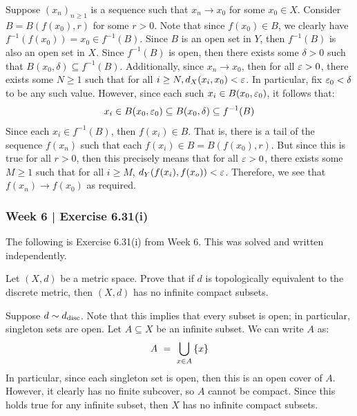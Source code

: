 \begin{pf}
    Suppose $ (x_{n})_{n \geq 1} $ is a sequence such that $ x_{n} \rightarrow
    x_{0} $ for some $ x_{0} \in X $. \vsp
    Consider $ B = B(f(x_{0}), r) $ for some $ r > 0 $.
    Note that since $ f(x_{0}) \in B $, we clearly have $ f^{-1}(f(x_{0})) =
    x_{0} \in f^{-1}(B) $. Since $ B $ is an open set in $ Y $, then
    $ f^{-1}(B) $ is also an open set in $ X $. \vsp
    Since $ f^{-1}(B) $ is open, then there exists some $ \delta > 0 $ such that
    $ B(x_{0}, \delta) \subseteq f^{-1}(B) $.
    Additionally, since $ x_{n} \rightarrow x_{0} $, then for all $ \operatorname{\varepsilon} > 0 $,
    there exists some $ N \geq 1 $ such that for all $ i \geq N, d_{X}(x_{i},
    x_{0}) < \operatorname{\varepsilon} $. In particular, fix $ \operatorname{\varepsilon}_{0} < \delta $ to be any such value.
    However, since each such $ x_{i} \in B(x_{0}, \operatorname{\varepsilon}_{0}) $, it follows that:
    \begin{equation*}
        x_{i} \in B(x_{0}, \operatorname{\varepsilon}_{0}) \subseteq B(x_{0}, \delta) \subseteq
        f^{-1}(B)
    \end{equation*}
    Since each $ x_{i} \in f^{-1}(B) $, then $ f(x_{i}) \in B $.
    That is, there is a tail of the sequence $ f(x_{n}) $ such that
    each $ f(x_{i}) \in B = B(f(x_{0}), r) $.
    But since this is true for all $ r > 0 $, then this precisely means that for
    all $ \operatorname{\varepsilon} > 0 $, there exists some $ M \geq 1 $ such that for all $ i
    \geq M $, $ d_{Y}(f(x_{i}), f(x_{o})) < \operatorname{\varepsilon} $. \vsp
    Therefore, we see that $ f(x_{n}) \rightarrow f(x_{0}) $ as required.
\end{pf}

\newpage
\subsubsection{Week 6 | Exercise 6.31(i)}

The following is Exercise 6.31(i) from Week 6.
This was solved and written independently.

\begin{exr}[num=6.31(i)]
    Let $ (X, d) $ be a metric space.
    Prove that if $ d $ is topologically equivalent to the discrete metric,
    then $ (X, d) $ has no infinite compact subsets.
\end{exr}

\begin{pf}
    Suppose $ d \sim d_{\textrm{disc}} $.
    Note that this implies that every subset is open; in particular, singleton
    sets are open. \vsp
    Let $ A \subseteq X $ be an infinite subset. We can write $ A $ as:
    \begin{equation*}
        A \ = \ \bigcup_{x \in A} \left\{{x}\right\}
    \end{equation*}
    In particular, since each singleton set is open, then this is an open cover
    of $ A $. However, it clearly has no finite subcover, so $ A $ cannot be
    compact. \vsp
    Since this holds true for any infinite subset, then $ X $ has no infinite
    compact subsets.
\end{pf}

